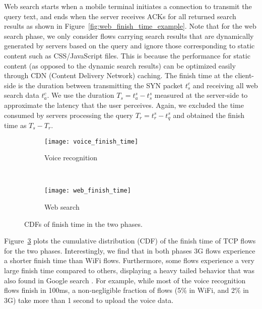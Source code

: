 Web search starts when a mobile terminal initiates a connection to transmit the query text, and ends when the server receives ACKs for all returned search results as shown in Figure~\ref{fig:web_finish_time_example}. Note that for the web search phase, we only consider flows carrying search results that are dynamically generated by servers based on the query and ignore those corresponding to static content such as CSS/JavaScript files. This is because the performance for static content (as opposed to the dynamic search results) can be optimized easily through CDN (Content Delivery Network) caching. The finish time at the client-side is the duration between transmitting the SYN packet $t^c_s$ and receiving all web search data $t^c_a$. We use the duration $T_s=t^s_a - t^s_s$ measured at the server-side to approximate the latency that the user perceives. Again, we excluded the time consumed by servers processing the query $T_r=t^s_r - t^s_q$ and obtained the finish time as $T_s-T_r$.

\begin{figure}[ht]
\centering
\begin{subfigure}[b]{0.8\linewidth}
	\texttt{[image: voice\_finish\_time]}
\caption{Voice recognition}
\label{fig:voice_finish_time}
\end{subfigure} \\
\begin{subfigure}[b]{0.8\linewidth}
	\texttt{[image: web\_finish\_time]}
\caption{Web search}
\label{fig:web_finish_time}
\end{subfigure}
\caption{CDFs of finish time in the two phases.}
\label{fig:finish_time}
\end{figure}


Figure~\ref{fig:finish_time} plots the cumulative distribution (CDF) of the finish time of TCP flows for the two phases. Interestingly, we find that in both phases 3G flows experience a shorter finish time than WiFi flows. Furthermore, some flows experience a very large finish time compared to others, displaying a heavy tailed behavior that was also found in Google search \cite{flach2013reducing}. For example, while most of the voice recognition flows finish in 100ms, a non-negligible fraction of flows (5\% in WiFi, and 2\% in 3G) take more than 1 second to upload the voice data. 


